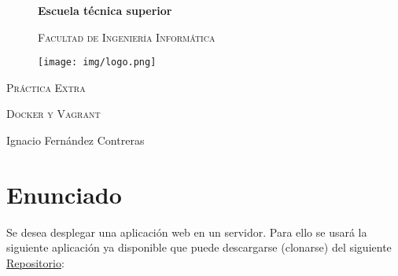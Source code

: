 \documentclass{article}
\begin{document}
\begin{titlepage}
\centering
\begin{figure}
\centering
{\bfseries\LARGE Escuela técnica superior\par}
{\scshape\Large Facultad de Ingeniería Informática\par}
\vspace{5cm}
\centering
\texttt{[image: img/logo.png]} 
\end{figure}


{\scshape\Huge Práctica Extra\par}
{\scshape\Large Docker y Vagrant\par}
\vspace{9cm}
{\Large Ignacio Fernández Contreras\par}
\vfill
\end{titlepage}
\clearpage\hbox{}\thispagestyle{empty}\newpage

\section{Enunciado}
\begin{flushleft}
Se desea desplegar una aplicación web en un servidor. Para ello se usará la siguiente aplicación ya
disponible que puede descargarse (clonarse) del siguiente \href{https://github.com/EGCETSII/1920-Practica-1}{Repositorio}:\\
\end{flushleft}
\end{document}
